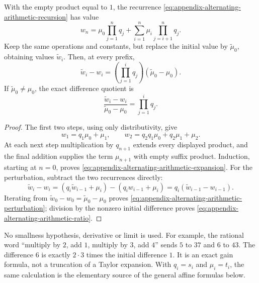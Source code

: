 \begin{proposition}
\label{prop:appendix-alternating-arithmetic-perturbation}
With the empty product equal to $1$, the recurrence
\eqref{eq:appendix-alternating-arithmetic-recursion} has value
\begin{equation}
  w_n=\mu_0\prod_{j=1}^n q_j
      +\sum_{i=1}^n\mu_i\prod_{j=i+1}^n q_j.
  \label{eq:appendix-alternating-arithmetic-expansion}
\end{equation}
Keep the same operations and constants, but replace the initial value by
$\widetilde\mu_0$, obtaining values $\widetilde w_i$.  Then, at every prefix,
\begin{equation}
  \widetilde w_i-w_i
    =\left(\prod_{j=1}^i q_j\right)(\widetilde\mu_0-\mu_0).
  \label{eq:appendix-alternating-arithmetic-perturbation}
\end{equation}
If $\widetilde\mu_0\ne\mu_0$, the exact difference quotient is
\begin{equation}
  \frac{\widetilde w_i-w_i}{\widetilde\mu_0-\mu_0}
    =\prod_{j=1}^i q_j.
  \label{eq:appendix-alternating-arithmetic-ratio}
\end{equation}
\end{proposition}

\begin{proof}
The first two steps, using only distributivity, give
\[
  w_1=q_1\mu_0+\mu_1,\qquad
  w_2=q_2q_1\mu_0+q_2\mu_1+\mu_2.
\]
At each next step multiplication by $q_{n+1}$ extends every displayed product,
and the final addition supplies the term $\mu_{n+1}$ with empty suffix
product.  Induction, starting at $n=0$, proves
\eqref{eq:appendix-alternating-arithmetic-expansion}.  For the perturbation,
subtract the two recurrences directly:
\[
  \widetilde w_i-w_i
   =(q_i\widetilde w_{i-1}+\mu_i)-(q_iw_{i-1}+\mu_i)
   =q_i(\widetilde w_{i-1}-w_{i-1}).
\]
Iterating from $\widetilde w_0-w_0=\widetilde\mu_0-\mu_0$ proves
\eqref{eq:appendix-alternating-arithmetic-perturbation}; division by the
nonzero initial difference proves
\eqref{eq:appendix-alternating-arithmetic-ratio}.
\end{proof}

No smallness hypothesis, derivative or limit is used.  For example, the rational
word ``multiply by $2$, add $1$, multiply by $3$, add $4$'' sends $5$ to $37$
and $6$ to $43$.  The difference $6$ is exactly $2\cdot3$ times the initial
difference $1$.  It is an exact gain formula, not a truncation of a Taylor
expansion.  With $q_i=s_i$ and $\mu_i=t_i$, the same calculation is the
elementary source of the general affine formulas below.

